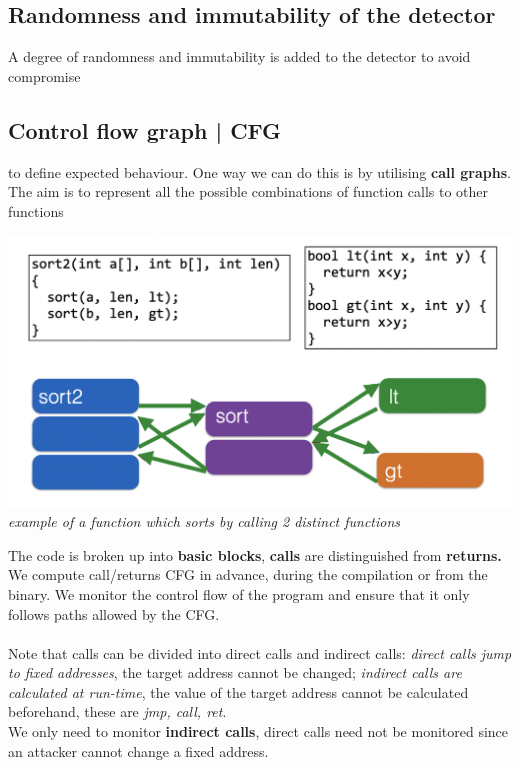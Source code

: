 \documentclass[11pt, oneside]{article}   	%
\begin{document}
\subsection*{Randomness and immutability of the detector} 
A degree of randomness and immutability is added to the detector to avoid compromise


\subsection*{Control flow graph | CFG} to define expected behaviour.
One way we can do this is by utilising \textbf{call graphs}. The aim is to represent all the possible combinations of function calls to other functions
\begin{center}
\includegraphics[scale = 0.4]{cfi}\\
\emph{example of a function which sorts by calling 2 distinct functions}
\end{center}
The code is broken up into \textbf{basic blocks}, \textbf{calls} are distinguished from \textbf{returns.}
We compute call/returns CFG in advance, during the compilation or from the binary. We monitor the control flow of the program and ensure that it only follows paths allowed by the CFG.\\\\
Note that calls can be divided into direct calls and indirect calls: \emph{direct calls jump to fixed addresses}, the target address cannot be changed; \emph{indirect calls are calculated at run-time}, the value of the target address cannot be calculated beforehand, these are \emph{jmp, call, ret}.\\
We only need to monitor \textbf{indirect calls}, direct calls need not be monitored since an attacker cannot change a fixed address.
\end{document}

